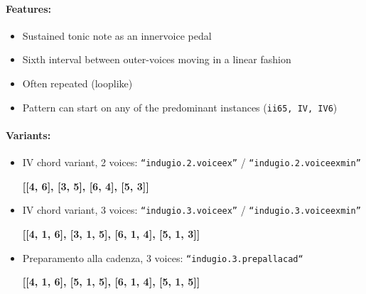 ﻿\documentclass[11pt, openany]{article}
\begin{document}
\begin{itemize}
\paragraph{Features:}
\begin{itemize}
\item Sustained tonic note as an innervoice pedal
\item Sixth interval between outer-voices moving in a linear fashion
\item Often repeated (looplike)
\item Pattern can start on any of the predominant instances (\texttt{ii65, IV, IV6})
\end{itemize}

\paragraph{Variants:}
\begin{itemize}
\item IV chord variant, 2 voices: \texttt{“indugio.2.voiceex”} / \texttt{“indugio.2.voiceexmin”}
	\begin{center}
	\textbf{[[4, 6], [3, 5], [6, 4], [5, 3]]}
	\end{center}
\item IV chord variant, 3 voices: \texttt{“indugio.3.voiceex”} / \texttt{“indugio.3.voiceexmin”}
	\begin{center}
	\textbf{[[4, 1, 6], [3, 1, 5], [6, 1, 4], [5, 1, 3]]}
	\end{center}
\item Preparamento alla cadenza, 3 voices: \texttt{“indugio.3.prepallacad“}
	\begin{center}
	\textbf{[[4, 1, 6], [5, 1, 5], [6, 1, 4], [5, 1, 5]]}
	\end{center}
\end{itemize}


\end{itemize}
\end{document}
